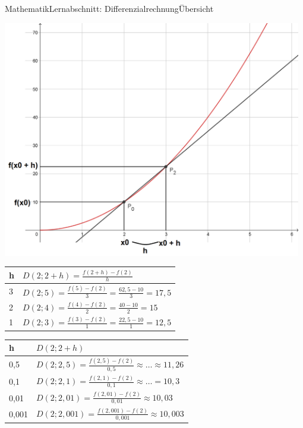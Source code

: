 \documentclass[11pt,twocolumn,oneside,openany,headings=optiontotoc,11pt,numbers=noenddot,final]{article}
\begin{document}
\begin{worksheet}{Mathematik}{Lernabschnitt: Differenzialrechnung}{Übersicht}
\begin{minipage}{0.22\textwidth}
		\end{minipage}
		\hfill
		\begin{minipage}{0.22\textwidth}
			\includegraphics[width=0.98\textwidth]{../99_Bilder/04_Skr_DiffQuo_3.jpg}
		\end{minipage}
		\par\noindent
		\renewcommand{\arraystretch}{1.5}
		\begin{tabularx}{0.48\textwidth}{l|X}
			h & \(D(2;2+h) = \frac{f(2+h)-f(2)}{h}\)\\
			\hline
			\hline
			3 & \(D(2;5) = \frac{f(5) - f(2)}{3} = \frac{62,5 - 10}{3} = 17,5\)\\
			\hline
			2 & \(D(2;4) = \frac{f(4) - f(2)}{2} = \frac{40 - 10}{2} = 15\)\\
			\hline
			1 & \(D(2;3) = \frac{f(3) - f(2)}{1} = \frac{22,5 - 10}{1} = 12,5\)\\
		\end{tabularx}
		\begin{tabularx}{0.48\textwidth}{l|X}
			h & \(D(2;2 + h)\)\\
			\hline
			\hline
			0,5 & \(D(2;2,5) = \frac{f(2,5) - f(2)}{0,5} \approx \ldots \approx 11,26\)\\
			\hline
			0,1 & \(D(2;2,1) = \frac{f(2,1) - f(2)}{0,1} \approx \ldots = 10,3\)\\
			\hline
			0,01 & \(D(2;2,01) = \frac{f(2,01) - f(2)}{0,01} \approx 10,03\)\\
			\hline
			0,001 & \(D(2;2,001) = \frac{f(2,001) - f(2)}{0,001} \approx 10,003\)\\
		\end{tabularx}

\end{worksheet}
\end{document}
